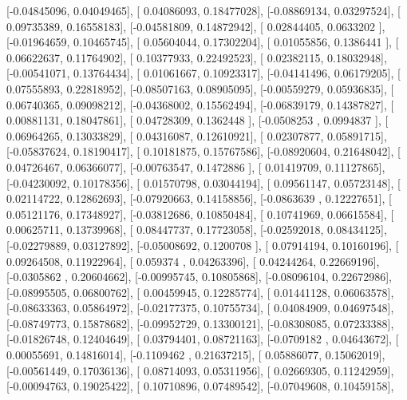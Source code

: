 \documentclass{article}
\begin{document}
       [-0.04845096,  0.04049465],
       [ 0.04086093,  0.18477028],
       [-0.08869134,  0.03297524],
       [ 0.09735389,  0.16558183],
       [-0.04581809,  0.14872942],
       [ 0.02844405,  0.0633202 ],
       [-0.01964659,  0.10465745],
       [ 0.05604044,  0.17302204],
       [ 0.01055856,  0.1386441 ],
       [ 0.06622637,  0.11764902],
       [ 0.10377933,  0.22492523],
       [ 0.02382115,  0.18032948],
       [-0.00541071,  0.13764434],
       [ 0.01061667,  0.10923317],
       [-0.04141496,  0.06179205],
       [ 0.07555893,  0.22818952],
       [-0.08507163,  0.08905095],
       [-0.00559279,  0.05936835],
       [ 0.06740365,  0.09098212],
       [-0.04368002,  0.15562494],
       [-0.06839179,  0.14387827],
       [ 0.00881131,  0.18047861],
       [ 0.04728309,  0.1362448 ],
       [-0.0508253 ,  0.0994837 ],
       [ 0.06964265,  0.13033829],
       [ 0.04316087,  0.12610921],
       [ 0.02307877,  0.05891715],
       [-0.05837624,  0.18190417],
       [ 0.10181875,  0.15767586],
       [-0.08920604,  0.21648042],
       [ 0.04726467,  0.06366077],
       [-0.00763547,  0.1472886 ],
       [ 0.01419709,  0.11127865],
       [-0.04230092,  0.10178356],
       [ 0.01570798,  0.03044194],
       [ 0.09561147,  0.05723148],
       [ 0.02114722,  0.12862693],
       [-0.07920663,  0.14158856],
       [-0.0863639 ,  0.12227651],
       [ 0.05121176,  0.17348927],
       [-0.03812686,  0.10850484],
       [ 0.10741969,  0.06615584],
       [ 0.00625711,  0.13739968],
       [ 0.08447737,  0.17723058],
       [-0.02592018,  0.08434125],
       [-0.02279889,  0.03127892],
       [-0.05008692,  0.1200708 ],
       [ 0.07914194,  0.10160196],
       [ 0.09264508,  0.11922964],
       [ 0.059374  ,  0.04263396],
       [ 0.04244264,  0.22669196],
       [-0.0305862 ,  0.20604662],
       [-0.00995745,  0.10805868],
       [-0.08096104,  0.22672986],
       [-0.08995505,  0.06800762],
       [ 0.00459945,  0.12285774],
       [ 0.01441128,  0.06063578],
       [-0.08633363,  0.05864972],
       [-0.02177375,  0.10755734],
       [ 0.04084909,  0.04697548],
       [-0.08749773,  0.15878682],
       [-0.09952729,  0.13300121],
       [-0.08308085,  0.07233388],
       [-0.01826748,  0.12404649],
       [ 0.03794401,  0.08721163],
       [-0.0709182 ,  0.04643672],
       [ 0.00055691,  0.14816014],
       [-0.1109462 ,  0.21637215],
       [ 0.05886077,  0.15062019],
       [-0.00561449,  0.17036136],
       [ 0.08714093,  0.05311956],
       [ 0.02669305,  0.11242959],
       [-0.00094763,  0.19025422],
       [ 0.10710896,  0.07489542],
       [-0.07049608,  0.10459158],
\end{document}
